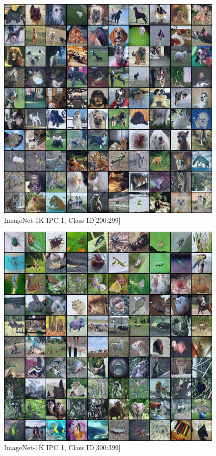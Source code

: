 \documentclass[10pt,twocolumn,letterpaper]{article}
\begin{document}
\begin{figure}
    \centering
    \includegraphics[width=\textwidth]{images/appendix/row-3-column-1.png}
    \caption{ImageNet-1K IPC 1, Class ID[200:299]}
\end{figure}
\begin{figure}
    \centering
    \includegraphics[width=\textwidth]{images/appendix/row-4-column-1.png}
    \caption{ImageNet-1K IPC 1, Class ID[300:399]}
\end{figure}
\end{document}
